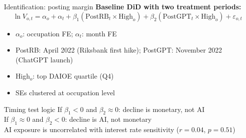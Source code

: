 \documentclass[aspectratio=169,11pt]{beamer}
\begin{document}
\begin{frame}{Identification: posting margin}
\textbf{Baseline DiD with two treatment periods:}
\vspace{-2mm}
\begin{equation*}
\ln V_{o,t} = \alpha_o + \alpha_t + \beta_1 (\text{PostRB}_t \times \text{High}_o) + \beta_2 (\text{PostGPT}_t \times \text{High}_o) + \varepsilon_{o,t}
\end{equation*}

\begin{itemize}
    \item $\alpha_o$: occupation FE; \quad $\alpha_t$: month FE
    \item PostRB: April 2022 (Riksbank first hike); \quad PostGPT: November 2022 (ChatGPT launch)
    \item High$_o$: top DAIOE quartile (Q4)
    \item SEs clustered at occupation level
\end{itemize}

\vspace{3mm}
\begin{block}{Timing test logic}
If $\beta_1 < 0$ and $\beta_2 \approx 0$: decline is monetary, not AI\\
If $\beta_1 \approx 0$ and $\beta_2 < 0$: decline is AI, not monetary\\
AI exposure is uncorrelated with interest rate sensitivity ($r = 0.04$, $p = 0.51$)
\end{block}
\end{frame}
\end{document}
